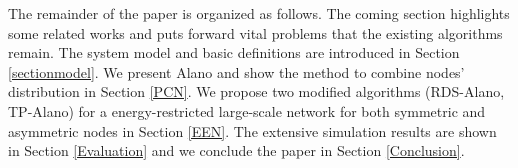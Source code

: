 The remainder of the paper is organized as follows. The coming section highlights some related works and puts forward vital problems that the existing algorithms remain. The system model and basic definitions are introduced in Section \ref{sectionmodel}. We present Alano and show the method to combine nodes' distribution in Section \ref{PCN}. We propose two modified algorithms (RDS-Alano, TP-Alano) for a energy-restricted large-scale network for both symmetric and asymmetric nodes in Section \ref{EEN}. The extensive simulation results are shown in Section \ref{Evaluation} and we conclude the paper in Section \ref{Conclusion}.







